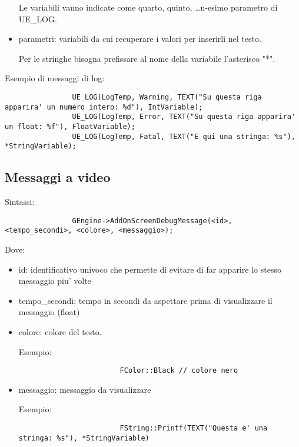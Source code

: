 \begin{itemize}
                    Le variabili vanno indicate come quarto, quinto, \dots n-esimo parametro di UE\_LOG.

                \item parametri: variabili da cui recuperare i valori per inserirli nel testo.

                    \begin{warningbox}
                        Per le stringhe bisogna prefissare al nome della variabile l'asterisco "*".
                    \end{warningbox}
            \end{itemize}

            Esempio di messaggi di log:

            \begin{verbatim}
                UE_LOG(LogTemp, Warning, TEXT("Su questa riga apparira' un numero intero: %d"), IntVariable);
                UE_LOG(LogTemp, Error, TEXT("Su questa riga apparira' un float: %f"), FloatVariable);
                UE_LOG(LogTemp, Fatal, TEXT("E qui una stringa: %s"), *StringVariable);
            \end{verbatim}

        \subsection{Messaggi a video}

            Sintassi:
            \begin{verbatim}
                GEngine->AddOnScreenDebugMessage(<id>, <tempo_secondi>, <colore>, <messaggio>);
            \end{verbatim}

            Dove:
            \begin{itemize}
                \item id: identificativo univoco che permette di evitare di far apparire lo stesso messaggio piu' volte
                \item tempo\_secondi: tempo in secondi da aspettare prima di visualizzare il messaggio (float)
                \item colore: colore del testo.

                    Esempio:
                    \begin{verbatim}
                        FColor::Black // colore nero
                    \end{verbatim}

                \item messaggio: messaggio da visualizzare

                    Esempio:
                    \begin{verbatim}
                        FString::Printf(TEXT("Questa e' una stringa: %s"), *StringVariable)
                    \end{verbatim}

            \end{itemize}

